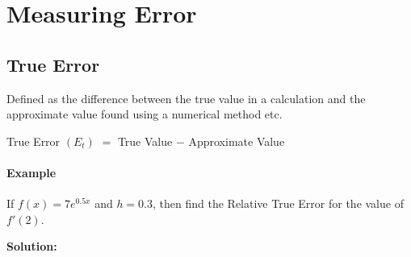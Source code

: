 \chapter{Measuring Error}

\section{True Error}

Defined as the difference between the true value in a calculation and the approximate value found using a numerical method etc.

\begin{center}
   True Error $(E_t)$ $=$ True Value $-$ Approximate Value
\end{center}

\subsubsection{Example}
If $f(x) = 7e^{0.5x}$ and $h=0.3$, then find the Relative True Error for the value of $f'(2)$.

\textbf{Solution:}

